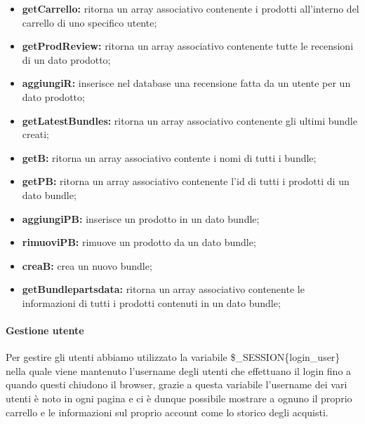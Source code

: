 \begin{itemize}
    \item \textbf{getCarrello:} ritorna un array associativo contenente i prodotti all'interno del carrello di uno specifico utente;
	\item \textbf{getProdReview:} ritorna un array associativo contenente tutte le recensioni di un dato prodotto;
	\item \textbf{aggiungiR:} inserisce nel database una recensione fatta da un utente per un dato prodotto;
	\item \textbf{getLatestBundles:} ritorna un array associativo contenente gli ultimi bundle creati; 
	\item \textbf{getB:} ritorna un array associativo contente i nomi di tutti i bundle;
	\item \textbf{getPB:} ritorna un array associativo contenente l'id di tutti i prodotti di un dato bundle;
	\item \textbf{aggiungiPB:} inserisce un prodotto in un dato bundle;
	\item \textbf{rimuoviPB:} rimuove un prodotto da un dato bundle;
	\item \textbf{creaB:} crea un nuovo bundle;
	\item \textbf{getBundlepartsdata:} ritorna un array associativo contenente le informazioni di tutti i prodotti contenuti in un dato bundle;
\end{itemize}

\paragraph{Gestione utente} \mbox{}
Per gestire gli utenti abbiamo utilizzato la variabile \$\_SESSION\{login\_user\} nella quale viene mantenuto l'username degli utenti che effettuano il login fino a quando questi chiudono il browser, grazie a questa variabile l'username dei vari utenti è noto in ogni pagina e ci è dunque possibile mostrare a ognuno il proprio carrello e le informazioni sul proprio account come lo storico degli acquisti.

